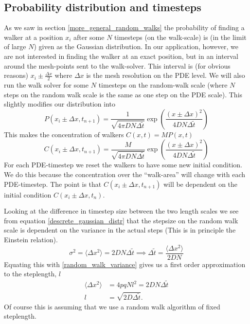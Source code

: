 \subsection{Probability distribution and timesteps}\label{probability_distribution_and_timesteps}
As we saw in section \ref{more_general_random_walks} the probability of finding a walker at a position $x_i$ after some $N$ timesteps (on the walk-scale) is (in the limit of large $N$) given as the Gaussian distribution. 
In our application, however, we are not interested in finding the walker at an exact position, but in an interval around the mesh-points sent to the walk-solver. 
This interval is (for obvious reasons) $x_i\pm\frac{\Delta x}{2}$ where $\Delta x$ is the mesh resolution on the PDE level. 
We will also run the walk solver for some $N$ timesteps on the random-walk scale (where $N$ steps on the random walk scale is the same as one step on the PDE scale). 
This slightly modifies our distribution into
\begin{equation}
 P(x_i\pm\Delta x,t_{n+1}) = \frac{1}{\sqrt{4\pi DN\Delta \tilde{t}}}\exp\left(\frac{(x\pm\Delta x)^2}{4DN\Delta \tilde{t}}\right)
\end{equation}
This makes the concentration of walkers $C(x,t) = MP(x,t)$
\begin{equation}
 C(x_i\pm\Delta x,t_{n+1}) = \frac{M}{\sqrt{4\pi DN\Delta \tilde{t}}}\exp\left(\frac{(x\pm\Delta x)^2}{4DN\Delta \tilde{t}}\right)
\end{equation}
For each PDE-timestep we reset the walkers to have some new initial condition. 
We do this because the concentration over the ``walk-area'' will change with each PDE-timestep.
The point is that $ C(x_i\pm\Delta x,t_{n+1})$ will be dependent on the initial condition $ C(x_i\pm\Delta x,t_{n})$.


Looking at the difference in timestep size between the two length scales we see from equation \ref{descrete_gaussian_distr} that the stepsize on the random walk scale is dependent on the variance in the actual steps (This is in principle the Einstein relation). 
\begin{equation}
 \sigma^2 = \langle\Delta x^2\rangle = 2DN\Delta\tilde{t} \implies \Delta\tilde{t} = \frac{\langle\Delta x^2\rangle}{2DN}
\end{equation}
Equating this with \ref{random_walk_variance} gives us a first order approximation to the steplength, $l$
\begin{align}
 \langle\Delta x^2\rangle &= 4pqNl^2 = 2DN\Delta\tilde{t} \nonumber \\ 
 l &= \sqrt{2D\Delta\tilde{t}}. \label{steplength}
\end{align}
Of course this is assuming that we use a random walk algorithm of fixed steplength.

